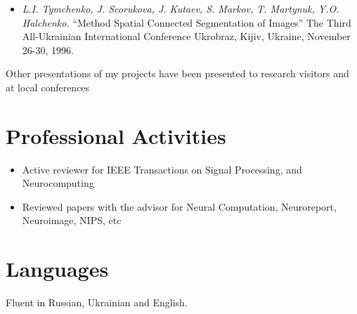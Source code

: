 \documentclass[10pt,overlapped,line]{res}
\newcommand{\mtitle}[1]{``#1''}
\newcommand{\mauthors}[1]{ \textit{#1.}}
\newcommand{\mwhere}[1]{#1.}
\begin{document}
\begin{resume}
\begin{itemize}
   \item
     \mauthors{L.I. Tymchenko, J. Scorukova, J. Kutaev, S. Markov, T. Martynuk, Y.O. Halchenko}
     \mtitle{Method Spatial Connected Segmentation of Images}
     \mwhere{The Third All-Ukrainian International Conference Ukrobraz, Kijiv, Ukraine, November 26-30, 1996}
 \end{itemize}

 Other presentations of my projects have been presented to research visitors and at local conferences

\section{Professional Activities}
\begin{itemize}
\item Active reviewer for IEEE Transactions on Signal Processing, and Neurocomputing
\item Reviewed papers with the advisor for Neural Computation,
  Neuroreport, Neuroimage, NIPS, etc
\end{itemize}


 \section{Languages}
 Fluent in Russian, Ukrainian and English.


\end{resume}
\end{document}
